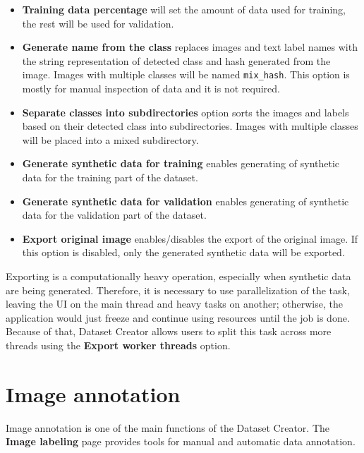 \begin{itemize}
  \item {\textbf{Training data percentage} will set the amount of data used for training, the rest will be used for validation.}
  
  \item {\textbf{Generate name from the class} replaces images and text label names with the string representation of detected class and hash generated from the image. Images with multiple classes will be named \texttt{mix\_hash}. This option is mostly for manual inspection of data and it is not required.}
  
  \item {\textbf{Separate classes into subdirectories} option sorts the images and labels based on their detected class into subdirectories. Images with multiple classes will be placed into a mixed subdirectory.}
  
  \item {\textbf{Generate synthetic data for training} enables generating of synthetic data for the training part of the dataset.}

  \item {\textbf{Generate synthetic data for validation} enables generating of synthetic data for the validation part of the dataset.}
  
  \item {\textbf{Export original image} enables/disables the export of the original image. If this option is disabled, only the generated synthetic data will be exported.}
\end{itemize}

Exporting is a computationally heavy operation, especially when synthetic data are being generated. Therefore, it is necessary to use parallelization of the task, leaving the UI on the main thread and heavy tasks on another; otherwise, the application would just freeze and continue using resources until the job is done. Because of that, Dataset Creator allows users to split this task across more threads using the \textbf{Export worker threads} option.




\section{Image annotation}
Image annotation is one of the main functions of the Dataset Creator. The \textbf{Image labeling} page provides tools for manual and automatic data annotation.

